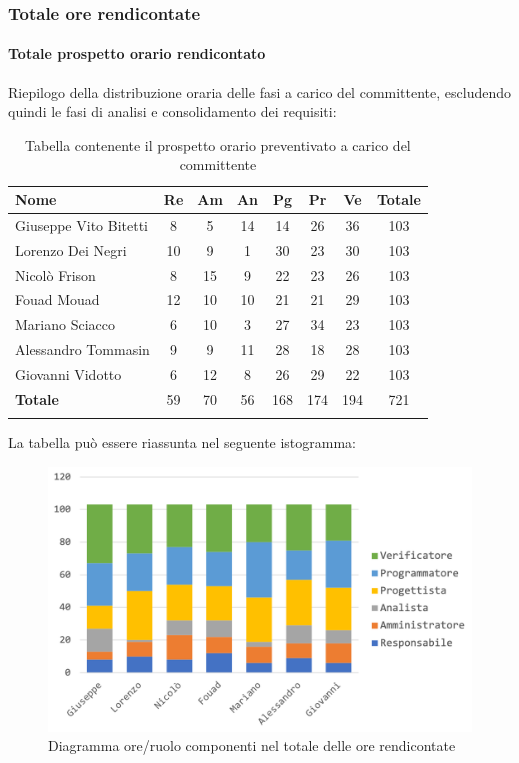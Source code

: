 			\subsubsection{Totale ore rendicontate}
				\paragraph{Totale prospetto orario rendicontato}
				Riepilogo della distribuzione oraria delle fasi a carico del committente, escludendo quindi le fasi di analisi e consolidamento dei requisiti:
				
				\begin{longtable}{|l|c|c|c|c|c|c|c|}
					\hline
					\rowcolor{lighter-grayer}
					\textbf{Nome} & \textbf{Re} & \textbf{Am} & \textbf{An} & \textbf{Pg}  & \textbf{Pr}   & \textbf{Ve} & \textbf{Totale} \\
					\hline
					\endfirsthead
					
					\hline
					Giuseppe Vito Bitetti 		& 8 & 5 & 14 & 14 & 26 & 36 & 103\\
					\hline
					\hline
					Lorenzo Dei Negri			& 10 & 9 & 1 & 30 & 23 & 30 & 103\\
					\hline
					\hline
					Nicolò Frison				    & 8 & 15 & 9 & 22 & 23 & 26 & 103\\
					\hline
					\hline
					Fouad Mouad 				 & 12 & 10 & 10 & 21 & 21 & 29 & 103\\
					\hline
					\hline
					Mariano Sciacco 			& 6 & 10 & 3 & 27 & 34 & 23 & 103\\
					\hline
					\hline
					Alessandro Tommasin    & 9 & 9 & 11 & 28 & 18 & 28 & 103\\
					\hline
					\hline
					Giovanni Vidotto 			 & 6 & 12 & 8 & 26 & 29 & 22 & 103\\
					\hline 
					\textbf{Totale}				 & 59 &  70 & 56 & 168 & 174 & 194 & 721\\
					\hline
					\caption{Tabella contenente il prospetto orario preventivato a carico del committente}
				\end{longtable}
				
				La tabella può essere riassunta nel seguente istogramma:
				\begin{figure}[H]
					\centering
					\includegraphics[width=0.8\linewidth]{./images/preventivo/totOreRed1.png}
					\caption{Diagramma ore/ruolo componenti nel totale delle ore rendicontate}
					\label{fig:diagramma suddivione ruoli totale ore rendicontete}
				\end{figure}
				\pagebreak
			
